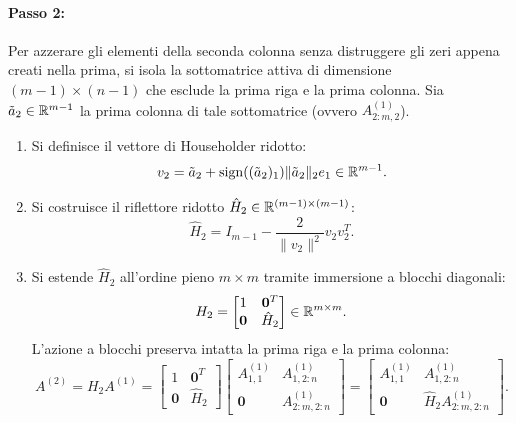 \paragraph{Passo 2:}
Per azzerare gli elementi della seconda colonna senza distruggere gli zeri appena creati nella prima, si isola la sottomatrice attiva di dimensione $(m-1) \times (n-1)$ che esclude la prima riga e la prima colonna.
Sia $\tilde{a}_2 \in \mathbb{R}^{m-1}$ la prima colonna di tale sottomatrice (ovvero $A^{(1)}_{2:m, 2}$).
\begin{enumerate}
    \item Si definisce il vettore di Householder ridotto:
    \begin{equation}
        v_2 = \tilde{a}_2 + \operatorname{sign}((\tilde{a}_2)_1) \|\tilde{a}_2\|_2 e_1 \in \mathbb{R}^{m-1}.
    \end{equation}
    \item Si costruisce il riflettore ridotto $\hat{H}_2 \in \mathbb{R}^{(m-1) \times (m-1)}$:
    \begin{equation}
        \hat{H}_2 = I_{m-1} - \frac{2}{\|v_2\|^2} v_2 v_2^T.
    \end{equation}
    \item Si estende $\hat{H}_2$ all'ordine pieno $m \times m$ tramite immersione a blocchi diagonali:
    \begin{equation}
        H_2 = \begin{bmatrix} 1 & \mathbf{0}^T \\ \mathbf{0} & \hat{H}_2 \end{bmatrix} \in \mathbb{R}^{m \times m}.
    \end{equation}
    L'azione a blocchi preserva intatta la prima riga e la prima colonna:
    \begin{equation}
        A^{(2)} = H_2 A^{(1)} = \begin{bmatrix} 1 & \mathbf{0}^T \\ \mathbf{0} & \hat{H}_2 \end{bmatrix} \begin{bmatrix} A^{(1)}_{1,1} & A^{(1)}_{1, 2:n} \\ \mathbf{0} & A^{(1)}_{2:m, 2:n} \end{bmatrix} = \begin{bmatrix} A^{(1)}_{1,1} & A^{(1)}_{1, 2:n} \\ \mathbf{0} & \hat{H}_2 A^{(1)}_{2:m, 2:n} \end{bmatrix}.
    \end{equation}
\end{enumerate}

